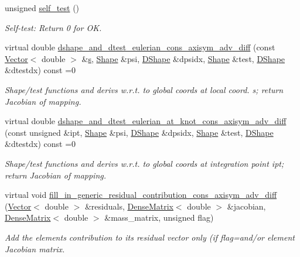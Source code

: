 \begin{DoxyCompactItemize}
unsigned \hyperlink{namespaceoomph_a6a5cfce839009bef49cce08492ec6aeb}{self\+\_\+test} ()
\begin{DoxyCompactList}\small\item\em Self-\/test\+: Return 0 for OK. \end{DoxyCompactList}\item 
virtual double \hyperlink{namespaceoomph_af332902ab67ff475277342a07dcb8a9b}{dshape\+\_\+and\+\_\+dtest\+\_\+eulerian\+\_\+cons\+\_\+axisym\+\_\+adv\+\_\+diff} (const \hyperlink{classoomph_1_1Vector}{Vector}$<$ double $>$ \&\hyperlink{cfortran_8h_ab7123126e4885ef647dd9c6e3807a21c}{s}, \hyperlink{classoomph_1_1Shape}{Shape} \&psi, \hyperlink{classoomph_1_1DShape}{D\+Shape} \&dpsidx, \hyperlink{classoomph_1_1Shape}{Shape} \&test, \hyperlink{classoomph_1_1DShape}{D\+Shape} \&dtestdx) const =0
\begin{DoxyCompactList}\small\item\em Shape/test functions and derivs w.\+r.\+t. to global coords at local coord. s; return Jacobian of mapping. \end{DoxyCompactList}\item 
virtual double \hyperlink{namespaceoomph_a1302011e0b30d149dd485a356f901289}{dshape\+\_\+and\+\_\+dtest\+\_\+eulerian\+\_\+at\+\_\+knot\+\_\+cons\+\_\+axisym\+\_\+adv\+\_\+diff} (const unsigned \&ipt, \hyperlink{classoomph_1_1Shape}{Shape} \&psi, \hyperlink{classoomph_1_1DShape}{D\+Shape} \&dpsidx, \hyperlink{classoomph_1_1Shape}{Shape} \&test, \hyperlink{classoomph_1_1DShape}{D\+Shape} \&dtestdx) const =0
\begin{DoxyCompactList}\small\item\em Shape/test functions and derivs w.\+r.\+t. to global coords at integration point ipt; return Jacobian of mapping. \end{DoxyCompactList}\item 
virtual void \hyperlink{namespaceoomph_a7d874a2081564c9490111b5fb936e46d}{fill\+\_\+in\+\_\+generic\+\_\+residual\+\_\+contribution\+\_\+cons\+\_\+axisym\+\_\+adv\+\_\+diff} (\hyperlink{classoomph_1_1Vector}{Vector}$<$ double $>$ \&residuals, \hyperlink{classoomph_1_1DenseMatrix}{Dense\+Matrix}$<$ double $>$ \&jacobian, \hyperlink{classoomph_1_1DenseMatrix}{Dense\+Matrix}$<$ double $>$ \&mass\+\_\+matrix, unsigned flag)
\begin{DoxyCompactList}\small\item\em Add the element\textquotesingle{}s contribution to its residual vector only (if flag=and/or element Jacobian matrix. \end{DoxyCompactList}\item 

\end{DoxyCompactItemize}
